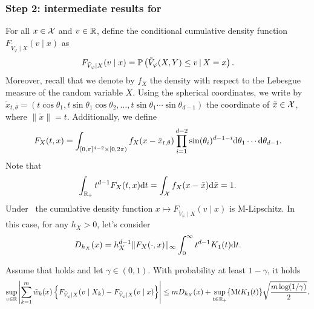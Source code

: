 \subsubsection{Step 2: intermediate results for }

For all $x\in\mathcal{X}$ and $v\in\mathbb{R}$, define the conditional cumulative density function $F_{\tilde{V}_{\varphi}\mid X}(v \mid x)$ as
\begin{equation*}
  F_{\tilde{V}_{\varphi}\mid X}(v \mid x)
  = \mathbb{P}\left({\tilde{V}_{\varphi}(X,Y) \le v \,\vert\, X=x }\right).
\end{equation*}
Moreover, recall that we denote by $f_X$ the density with respect to the Lebesgue measure of the random variable $X$.
Using the spherical coordinates, we write by $\tilde{x}_{t,\theta}=(t\cos \theta_1, t\sin\theta_1\cos\theta_2,\ldots,t\sin\theta_1\cdots\sin\theta_{d-1})$ the coordinate of $\tilde{x}\in\mathcal{X}$, where $\|\tilde{x}\|=t$. Additionally, we define 
\begin{equation}\label{eq:def:FXtx}
  F_{X}(t,x)
  = \int_{[0,\pi]^{d-2}\times [0,2\pi)} f_{X}(x-\tilde{x}_{t,\theta}) \prod_{i=1}^{d-2} \sin(\theta_i)^{d-1-i} \mathrm{d} \theta_{1}\cdots \mathrm{d} \theta_{d-1}.
\end{equation}
Note that
\begin{equation*}
  \int_{\mathbb{R}_+} t^{d-1} F_{X}(t,x) \mathrm{d} t
  = \int_{\mathcal{X}} f_X(x-\tilde{x}) \mathrm{d} \tilde{x}
  = 1.
\end{equation*}
%
Under~ the cumulative density function $x\mapsto F_{\tilde{V}_{\varphi}\mid X}(v \mid x)$ is $\mathrm{M}$-Lipschitz. In this case, for any $h_X>0$, let's consider
\begin{equation}\label{eq:def:DhXr}
  D_{h_X}(x)
  = h_{X}^{d-1} \|{F_{X}(\cdot,x)}\|_{\infty} \int_{0}^{\infty} t^{d-1} K_{1}(t) \mathrm{d} t.
\end{equation}

\begin{lemma}\label{lem:step3}
  Assume that  holds and let $\gamma\in(0,1)$. 
  With probability at least $1-\gamma$, it holds
  \begin{equation*}
    \sup_{v\in\mathbb{R}} \left\lvert{ \sum_{k=1}^{m} \tilde{w}_{k}(x) \left\{{
      F_{\tilde{V}_{\varphi}\mid X}(v \mid X_k) - F_{\tilde{V}_{\varphi}\mid X}(v \mid x)
    }\right\}}\right\rvert
    \le m D_{h_X}(x)
    + \sup_{t\in\mathbb{R}_+}\{{\mathrm{M} t K_{1}(t)}\} \sqrt{\frac{m \log(1/\gamma)}{2}}
    .
  \end{equation*}
\end{lemma}

